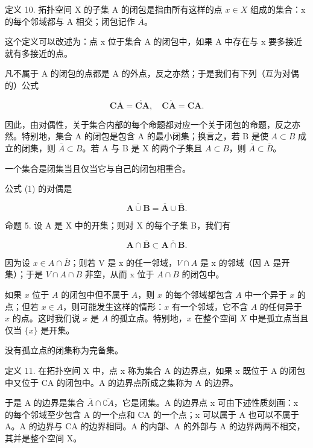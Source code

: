 定义 10. 拓扑空间 X 的子集 A 的闭包是指由所有这样的点 \(x \in X\) 组成的集合：x 的每个邻域都与 A 相交；闭包记作 \(\overline{A}\)。

这个定义可以改述为：点 x 位于集合 A 的闭包中，如果 A 中存在与 x 要多接近就有多接近的点。

凡不属于 A 的闭包的点都是 A 的外点，反之亦然；于是我们有下列（互为对偶的）公式

\[
\mathbf {C} \overline {{\mathbf {A}}} = \mathring {\mathbf {C} \mathbf {A}}, \quad \mathbf {C} \mathring {\mathbf {A}} = \overline {{\mathbf {C} \mathbf {A}}}.\tag{2}
\]

因此，由对偶性，关于集合内部的每个命题都对应一个关于闭包的命题，反之亦然。特别地，集合 A 的闭包是包含 A 的最小闭集；换言之，若 B 是使 \(A \subset B\) 成立的闭集，则 \(\overline{A} \subset B\)。若 A 与 B 是 X 的两个子集且 \(A \subset B\)，则 \(\overline{A} \subset \overline{B}\)。

一个集合是闭集当且仅当它与自己的闭包相重合。

公式 (1) 的对偶是

\[
\overline {{{\mathbf {A} \cup \mathbf {B}}}} = \overline {{{\mathbf {A}}}} \cup \overline {{{\mathbf {B}}}}.\tag{3}
\]

命题 5. 设 A 是 X 中的开集；则对 X 的每个子集 B，我们有

\[
\mathbf {A} \cap \overline {{\mathbf {B}}} \subset \overline {{\mathbf {A} \cap \mathbf {B}}}.\tag{4}
\]

因为设 \(x \in A \cap \overline{B}\)；则若 V 是 x 的任一邻域，\(V \cap A\) 是 x 的邻域（因 A 是开集）；于是 \(V \cap A \cap B\) 非空，从而 x 位于 \(A \cap B\) 的闭包中。

如果 \(x\) 位于 \(A\) 的闭包中但不属于 \(A\)，则 \(x\) 的每个邻域都包含 \(A\) 中一个异于 \(x\) 的点；但若 \(x \in A\)，则可能发生这样的情形：\(x\) 有一个邻域，它不含 \(A\) 的任何异于 \(x\) 的点。这时我们说 \(x\) 是 \(A\) 的孤立点。特别地，\(x\) 在整个空间 \(X\) 中是孤立点当且仅当 \(\{x\}\) 是开集。

没有孤立点的闭集称为完备集。

定义 11. 在拓扑空间 X 中，点 x 称为集合 A 的边界点，如果 x 既位于 A 的闭包中又位于 CA 的闭包中。A 的边界点所成之集称为 A 的边界。

于是 A 的边界是集合 \(\overline{A} \cap \overline{\complement A}\)，它是闭集。A 的边界点 x 可由下述性质刻画：x 的每个邻域至少包含 A 的一个点和 CA 的一个点；x 可以属于 A 也可以不属于 A。A 的边界与 CA 的边界相同。A 的内部、A 的外部与 A 的边界两两不相交，其并是整个空间 X。

